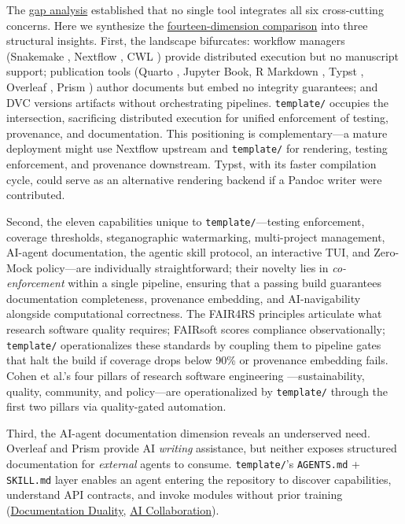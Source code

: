 \documentclass[
]{article}
\begin{document}
The \href{02_introduction.md\#the-gap}{gap analysis} established that no
single tool integrates all six cross-cutting concerns. Here we
synthesize the
\href{08f_appendix_matrix.md\#appendix-matrix}{fourteen-dimension
comparison} into three structural insights. First, the landscape
bifurcates: workflow managers (Snakemake \citep{koster2012snakemake},
Nextflow \citep{ditommaso2017nextflow}, CWL \citep{amstutz2016cwl})
provide distributed execution but no manuscript support; publication
tools (Quarto \citep{allaire2024quarto}, Jupyter Book, R Markdown
\citep{xie2018dynamic}, Typst \citep{madje2023typst}, Overleaf
\citep{overleaf2025}, Prism \citep{openai2026prism}) author documents
but embed no integrity guarantees; and DVC \citep{iterative2024dvc}
versions artifacts without orchestrating pipelines. \texttt{template/}
occupies the intersection, sacrificing distributed execution for unified
enforcement of testing, provenance, and documentation. This positioning
is complementary---a mature deployment might use Nextflow upstream and
\texttt{template/} for rendering, testing enforcement, and provenance
downstream. Typst, with its faster compilation cycle, could serve as an
alternative rendering backend if a Pandoc writer were contributed.

Second, the eleven capabilities unique to \texttt{template/}---testing
enforcement, coverage thresholds, steganographic watermarking,
multi-project management, AI-agent documentation, the agentic skill
protocol, an interactive TUI, and Zero-Mock policy---are individually
straightforward; their novelty lies in \emph{co-enforcement} within a
single pipeline, ensuring that a passing build guarantees documentation
completeness, provenance embedding, and AI-navigability alongside
computational correctness. The FAIR4RS principles
\citep{barker2022fair4rs, lamprecht2020towards} articulate what research
software quality requires; FAIRsoft \citep{garijo2024fairsoft} scores
compliance observationally; \texttt{template/} operationalizes these
standards by coupling them to pipeline gates that halt the build if
coverage drops below 90\% or provenance embedding fails. Cohen et al.'s
four pillars of research software engineering
\citep{cohen2021four}---sustainability, quality, community, and
policy---are operationalized by \texttt{template/} through the first two
pillars via quality-gated automation.

Third, the AI-agent documentation dimension reveals an underserved need.
Overleaf and Prism provide AI \emph{writing} assistance, but neither
exposes structured documentation for \emph{external} agents to consume.
\texttt{template/}'s \texttt{AGENTS.md} + \texttt{SKILL.md} layer
enables an agent entering the repository to discover capabilities,
understand API contracts, and invoke modules without prior training
(\href{03c_documentation.md\#documentation-duality-and-ai-collaboration}{Documentation
Duality}, \href{05d_ai_collaboration.md\#the-ai-collaboration-model}{AI
Collaboration}).
\end{document}
